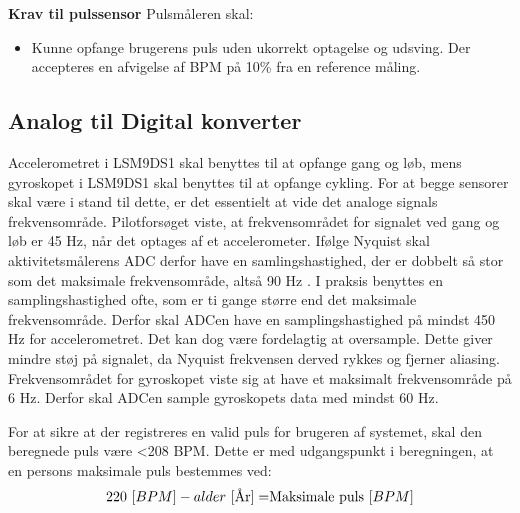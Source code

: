 \textbf{Krav til pulssensor} \newline
Pulsmåleren skal:
\begin{itemize}
\item Kunne opfange brugerens puls uden ukorrekt optagelse og udsving. Der accepteres en afvigelse af BPM på 10\% fra en reference måling.
\end{itemize}

\subsection{Analog til Digital konverter} \label{krav_adc}
Accelerometret i LSM9DS1 skal benyttes til at opfange gang og løb, mens gyroskopet i LSM9DS1 skal benyttes til at opfange cykling. For at begge sensorer skal være i stand til dette, er det essentielt at vide det analoge signals frekvensområde. %
Pilotforsøget viste, at frekvensområdet for signalet ved gang og løb er 45 Hz, når det optages af et accelerometer. Ifølge Nyquist skal aktivitetsmålerens ADC derfor have en samlingshastighed, der er dobbelt så stor som det maksimale frekvensområde, altså 90 Hz \citep{Webster2011}. I praksis benyttes en samplingshastighed ofte, som er ti gange større end det maksimale frekvensområde. Derfor skal ADCen have en samplingshastighed på mindst 450 Hz for accelerometret. Det kan dog være fordelagtig at oversample. Dette giver mindre støj på signalet, da Nyquist frekvensen derved rykkes og fjerner aliasing. \citep{Webster2011} \newline
Frekvensområdet for gyroskopet viste sig at have et maksimalt frekvensområde på 6 Hz. Derfor skal ADCen sample gyroskopets data med mindst 60 Hz.

For at sikre at der registreres en valid puls for brugeren af systemet, skal den beregnede puls være <208 BPM. Dette er med udgangspunkt i beregningen, at en persons maksimale puls bestemmes ved: \citep{CooperBlair2005} 
\begin{equation}
220~[BPM] - alder~[$År$] = $Maksimale puls$~[BPM]
\end{equation}

